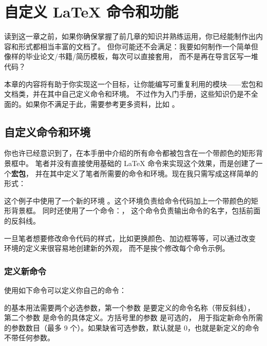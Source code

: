 \chapter{自定义 \LaTeX{} 命令和功能}\label{chap:custom}

\begin{intro}
读到这一章之前，如果你确保掌握了前几章的知识并熟练运用，你已经能制作出内容和形式都相当丰富的文档了。
但你可能还不会满足：我要如何制作一个简单但像样的毕业论文/书籍/简历模板，每次可以直接套用，
而不是再在导言区写一堆代码？

本章的内容将有助于你实现这一个目标，让你能编写可重复利用的模块——宏包和文档类，并在其中自己定义命令和环境。
不过作为入门手册，这些知识仍是不全面的。如果你不满足于此，需要参考更多资料，比如 \cite{companion,clsguide}。
\end{intro}

\section{自定义命令和环境}\label{sec:defs}

你也许已经意识到了，在本手册中介绍的所有命令都被包含在一个带颜色的矩形背景框中。
笔者并没有直接使用基础的 \LaTeX{} 命令来实现这个效果，而是创建了一个\textbf{宏包}，
并在其中定义了笔者所需要的命令和环境。现在我只需写成这样简单的形式：

\begin{example}
\begin{command}
\end{command}
\end{example}

这个例子中使用了一个新的环境 。这个环境负责给命令代码加上一个带颜色的矩形背景框。
同时还使用了一个命令：， 这个命令负责输出命令的名字，包括前面的反斜线。

一旦笔者想要修改命令代码的样式，比如更换颜色、加边框等等，可以通过改变  环境的定义来很容易地创建新的外观，
而不是挨个修改每个命令示例。

\subsection{定义新命令}\label{subsec:newcmd}

使用如下命令可以定义你自己的命令：
\begin{command}
\end{command}
 的基本用法需要两个必选参数，第一个参数  是要定义的命令名称（带反斜线），
第二个参数  是命令的具体定义。方括号里的参数  是可选的，
用于指定新命令所需的参数数目（最多 9 个）。如果缺省可选参数，默认就是 0，也就是新定义的命令不带任何参数。

